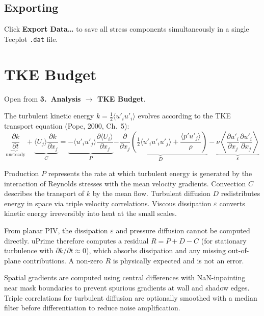 \documentclass[11pt, a4paper]{report}
\newcommand{\uipth}[1]{\textbf{\textcolor{upblue}{#1}}}
\begin{document}
\section{Exporting}

Click \uipth{Export Data\ldots} to save all stress components simultaneously in a single Tecplot \texttt{.dat} file.

\chapter{TKE Budget}
\label{ch:tke}

Open from \uipth{3.\ Analysis $\to$ TKE Budget}.

The turbulent kinetic energy $k = \tfrac{1}{2}\langle u'_i u'_i \rangle$ evolves according to the TKE transport equation (Pope, 2000, Ch.\ 5):
\[
\underbrace{\frac{\partial k}{\partial t}}_{\text{unsteady}} + \underbrace{\langle U_j \rangle \frac{\partial k}{\partial x_j}}_{C} = \underbrace{-\langle u'_i u'_j \rangle \frac{\partial \langle U_i \rangle}{\partial x_j}}_{P} \underbrace{- \frac{\partial}{\partial x_j}\!\left(\tfrac{1}{2}\langle u'_i u'_i u'_j \rangle + \frac{\langle p' u'_j \rangle}{\rho}\right)}_{D} - \underbrace{\nu \left\langle \frac{\partial u'_i}{\partial x_j}\frac{\partial u'_i}{\partial x_j} \right\rangle}_{\varepsilon}
\]

Production $P$ represents the rate at which turbulent energy is generated by the interaction of Reynolds stresses with the mean velocity gradients. Convection $C$ describes the transport of $k$ by the mean flow. Turbulent diffusion $D$ redistributes energy in space via triple velocity correlations. Viscous dissipation $\varepsilon$ converts kinetic energy irreversibly into heat at the small scales.

From planar PIV, the dissipation $\varepsilon$ and pressure diffusion cannot be computed directly. uPrime therefore computes a residual $R = P + D - C$ (for stationary turbulence with $\partial k/\partial t \approx 0$), which absorbs dissipation and any missing out-of-plane contributions. A non-zero $R$ is physically expected and is not an error.

Spatial gradients are computed using central differences with NaN-inpainting near mask boundaries to prevent spurious gradients at wall and shadow edges. Triple correlations for turbulent diffusion are optionally smoothed with a median filter before differentiation to reduce noise amplification.
\end{document}
